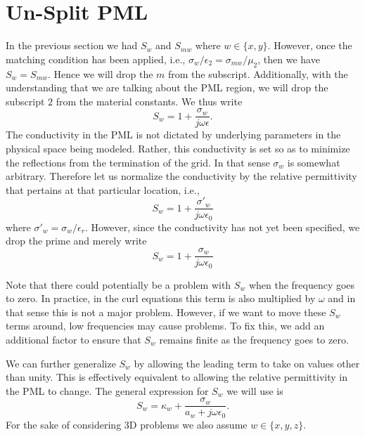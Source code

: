 \section{Un-Split PML}

In the previous section we had $S_w$ and $S_{mw}$ where $w\in\{x,y\}$.
However, once the matching condition has been applied, i.e.,
$\sigma_w/\epsilon_2 = \sigma_{mw}/\mu_2$, then we have $S_w=S_{mw}$.
Hence we will drop the $m$ from the subscript.  Additionally, with the
understanding that we are talking about the PML region, we will drop
the subscript $2$ from the material constants.  We thus write
\begin{equation}
  S_w = 1 + \frac{\sigma_w}{j\omega\epsilon}.
\end{equation}
The conductivity in the PML is not dictated by underlying parameters
in the physical space being modeled.  Rather, this conductivity is set
so as to minimize the reflections from the termination of the grid.
In that sense $\sigma_w$ is somewhat arbitrary.  Therefore let us
normalize the conductivity by the relative permittivity that pertains
at that particular location, i.e., 
\begin{equation}
  S_w = 1 + \frac{\sigma'_w}{j\omega\epsilon_0}
\end{equation}
where $\sigma'_w = \sigma_w/\epsilon_r$.  However, since the
conductivity has not yet been specified, we drop the prime and merely
write 
\begin{equation}
  S_w = 1 + \frac{\sigma_w}{j\omega\epsilon_0}
\end{equation}

Note that there could potentially be a problem with $S_w$ when the
frequency goes to zero.  In practice, in the curl equations this term
is also multiplied by $\omega$ and in that sense this is not a major
problem.  However, if we want to move these $S_w$ terms around, low
frequencies may cause problems.  To fix this, we add an additional
factor to ensure that $S_w$ remains finite as the frequency goes to
zero.

We can further generalize $S_w$ by allowing the leading term to take
on values other than unity.  This is effectively equivalent to
allowing the relative permittivity in the PML to change.  The general
expression for $S_w$ we will use is
\begin{equation}
  S_w = \kappa_w + \frac{\sigma_w}{a_w + j\omega\epsilon_0}.
\end{equation}
For the sake of considering 3D problems we also assume $w\in\{x,y,z\}$.

